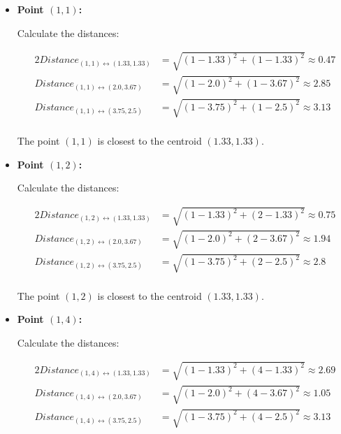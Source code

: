 \documentclass[
english,
smallborders
]{i6prcsht}
\begin{document}
\begin{solution}
\begin{enumerate}
		      \begin{itemize}
			      \item \textbf{Point $(1,1)$:}
			            
			            Calculate the distances:
			            
			            \begin{alignat*}{2}
				            Distance_{(1,1)\leftrightarrow(1.33,1.33)} & = \sqrt{(1-1.33)^2+(1-1.33)^2} \approx 0.47 \\
				            Distance_{(1,1)\leftrightarrow(2.0,3.67)}  & = \sqrt{(1-2.0)^2+(1-3.67)^2} \approx 2.85  \\
				            Distance_{(1,1)\leftrightarrow(3.75,2.5)}  & = \sqrt{(1-3.75)^2+(1-2.5)^2} \approx 3.13  \\
			            \end{alignat*}
			            
			            The point $(1,1)$ is closest to the centroid $(1.33,1.33)$.
			            
			      \item \textbf{Point $(1,2)$:}
			            
			            Calculate the distances:
			            
			            \begin{alignat*}{2}
				            Distance_{(1,2)\leftrightarrow(1.33,1.33)} & = \sqrt{(1-1.33)^2+(2-1.33)^2} \approx 0.75 \\
				            Distance_{(1,2)\leftrightarrow(2.0,3.67)}  & = \sqrt{(1-2.0)^2+(2-3.67)^2} \approx 1.94  \\
				            Distance_{(1,2)\leftrightarrow(3.75,2.5)}  & = \sqrt{(1-3.75)^2+(2-2.5)^2} \approx 2.8   \\
			            \end{alignat*}
			            
			            The point $(1,2)$ is closest to the centroid $(1.33,1.33)$.
			            
			      \item \textbf{Point $(1,4)$:}
			            
			            Calculate the distances:
			            
			            \begin{alignat*}{2}
				            Distance_{(1,4)\leftrightarrow(1.33,1.33)} & = \sqrt{(1-1.33)^2+(4-1.33)^2} \approx 2.69 \\
				            Distance_{(1,4)\leftrightarrow(2.0,3.67)}  & = \sqrt{(1-2.0)^2+(4-3.67)^2} \approx 1.05  \\
				            Distance_{(1,4)\leftrightarrow(3.75,2.5)}  & = \sqrt{(1-3.75)^2+(4-2.5)^2} \approx 3.13  \\
			            \end{alignat*}
			            

\end{itemize}
\end{enumerate}
\end{solution}
\end{document}
